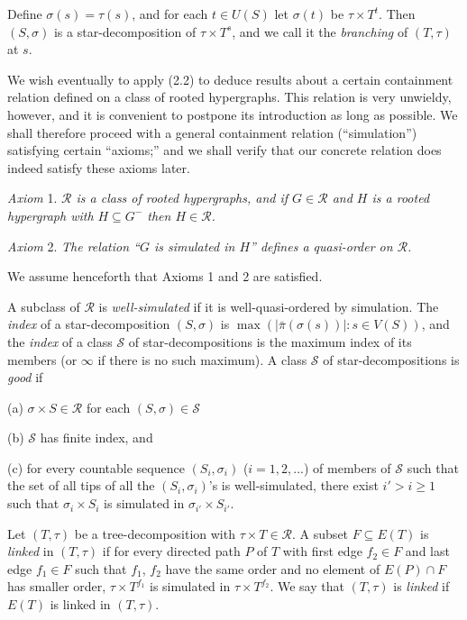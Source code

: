 Define $\sigma(s) = \tau(s)$, and for each $t \in U(S)$ let $\sigma(t)$ be $\tau \times T^t$. Then $(S, \sigma)$ is a star-decomposition of $\tau \times T^s$, and we call it the \textit{branching} of $(T, \tau)$ at $s$.

We wish eventually to apply (2.2) to deduce results about a certain containment relation defined on a class of rooted hypergraphs. This relation is very unwieldy, however, and it is convenient to postpone its introduction as long as possible. We shall therefore proceed with a general containment relation (``simulation'') satisfying certain ``axioms;'' and we shall verify that our concrete relation does indeed satisfy these axioms later.

\textit{Axiom} 1. \textit{$\mathscr{R}$ is a class of rooted hypergraphs, and if $G \in \mathscr{R}$ and $H$ is a rooted hypergraph with $H \subseteq G^-$ then $H \in \mathscr{R}$.}

\textit{Axiom} 2. \textit{The relation ``$G$ is simulated in $H$'' defines a quasi-order on $\mathscr{R}$.}

We assume henceforth that Axioms 1 and 2 are satisfied.

A subclass of $\mathscr{R}$ is \textit{well-simulated} if it is well-quasi-ordered by simulation. The \textit{index} of a star-decomposition $(S, \sigma)$ is $\max(|\bar{\pi}(\sigma(s))| : s \in V(S))$, and the \textit{index} of a class $\mathscr{S}$ of star-decompositions is the maximum index of its members (or $\infty$ if there is no such maximum). A class $\mathscr{S}$ of star-decompositions is \textit{good} if

\hspace*{12pt}(a) $\sigma \times S \in \mathscr{R}$ for each $(S, \sigma) \in \mathscr{S}$

\hspace*{12pt}(b) $\mathscr{S}$ has finite index, and

\hspace*{12pt}(c) for every countable sequence $(S_i, \sigma_i)$ ($i = 1, 2, ...$) of members of $\mathscr{S}$ such that the set of all tips of all the $(S_i, \sigma_i)$'s is well-simulated, there exist $i' > i \ge 1$ such that $\sigma_i \times S_i$ is simulated in $\sigma_{i'} \times S_{i'}$.

Let $(T, \tau)$ be a tree-decomposition with $\tau \times T \in \mathscr{R}$. A subset $F \subseteq E(T)$ is \textit{linked} in $(T, \tau)$ if for every directed path $P$ of $T$ with first edge $f_2 \in F$ and last edge $f_1 \in F$ such that $f_1$, $f_2$ have the same order and no element of $E(P) \cap F$ has smaller order, $\tau \times T^{f_1}$ is simulated in $\tau \times T^{f_2}$. We say that $(T, \tau)$ is \textit{linked} if $E(T)$ is linked in $(T, \tau)$.

